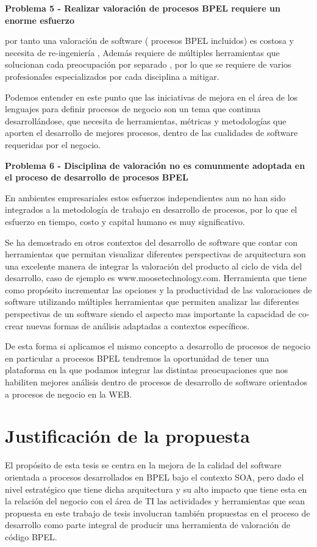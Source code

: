 \documentclass[spanish]{article}
\begin{document}
\textbf{Problema 5 - Realizar valoración de procesos BPEL requiere
un enorme esfuerzo}

por tanto una valoración de software ( procesos BPEL incluidos) es
costosa y necesita de re-ingeniería \cite{Girb2011}, Además requiere
de múltiples herramientas que solucionan cada preocupación por separado
, por lo que se requiere de varios profesionales especializados por
cada disciplina a mitigar.

Podemos entender en este punto que las iniciativas de mejora en el
área de los lenguajes para definir procesos de negocio son un tema
que continua desarrollándose, que necesita de herramientas, métricas
y metodologías que aporten el desarrollo de mejores procesos, dentro
de las cualidades de software requeridas por el negocio.

\textbf{Problema 6 - Disciplina de valoración no es comunmente adoptada
en el proceso de desarrollo de procesos BPEL}

En ambientes empresariales estos esfuerzos independientes aun no han
sido integrados a la metodología de trabajo en desarrollo de procesos,
por lo que el esfuerzo en tiempo, costo y capital humano es muy significativo.

Se ha demostrado en otros contextos del desarrollo de software que
contar con herramientas que permitan visualizar diferentes perspectivas
de arquitectura son una excelente manera de integrar la valoración
del producto al ciclo de vida del desarrollo, caso de ejemplo es www.moosetechnology.com.
Herramienta que tiene como propósito incrementar las opciones y la
productividad de las valoraciones de software utilizando múltiples
herramientas que permiten analizar las diferentes perspectivas de
un software siendo el aspecto mas importante la capacidad de co-crear
nuevas formas de análisis adaptadas a contextos específicos.

De esta forma si aplicamos el mismo concepto a desarrollo de procesos
de negocio en particular a procesos BPEL tendremos la oportunidad
de tener una plataforma en la que podamos integrar las distintas preocupaciones
que nos habiliten mejores análisis dentro de procesos de desarrollo
de software orientados a procesos de negocio en la WEB.


\section{Justificación de la propuesta}

El propósito de esta tesis se centra en la mejora de la calidad del
software orientada a procesos desarrollados en BPEL bajo el contexto
SOA, pero dado el nivel estratégico que tiene dicha arquitectura y
su alto impacto que tiene esta en la relación del negocio con el área
de TI las actividades y herramientas que sean propuesta en este trabajo
de tesis involucran también propuestas en el proceso de desarrollo
como parte integral de producir una herramienta de valoración de código
BPEL.
\end{document}
